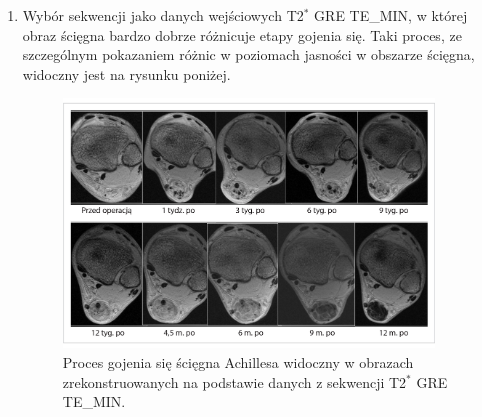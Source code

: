 \begin{enumerate}
	\item Wybór sekwencji jako danych wejściowych T2$^\ast$ GRE TE\_MIN, w której obraz ścięgna bardzo dobrze różnicuje etapy gojenia się. Taki proces, ze szczególnym pokazaniem różnic w poziomach jasności w obszarze ścięgna, widoczny jest \linebreak na rysunku poniżej.
	\begin{figure}[h!]
		\raggedleft 
		\includegraphics[width=0.93\textwidth]{figures/T2gremin.jpg}
		\caption{Proces gojenia się ścięgna Achillesa widoczny w obrazach zrekonstruowanych na podstawie danych z sekwencji T2$^\ast$ GRE TE\_MIN.}\label{fig:T2comp}
	\end{figure}
	

\end{enumerate}
